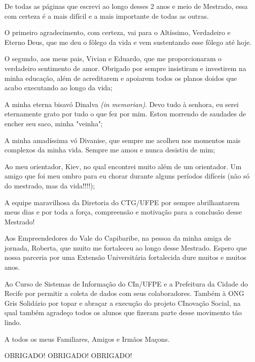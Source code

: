 \begin{agradecimentos}

De todas as páginas que escrevi ao longo desses 2 anos e meio de Mestrado, essa com certeza é a mais difícil e a mais importante de todas as outras.

O primeiro agradecimento, com certeza, vai para o Altíssimo, Verdadeiro e Eterno Deus, que me deu o fôlego da vida e vem sustentando esse fôlego até hoje.

O segundo, aos meus pais, Vivian e Eduardo, que me proporcionaram o verdadeiro sentimento de amor. Obrigado por sempre insistiram e investirem na minha educação, além de acreditarem e apoiarem todos os planos doidos que acabo executando ao longo da vida;

A minha eterna bisavó Dinalva \textit{(in memorian)}. Devo tudo à senhora, eu serei eternamente grato por tudo o que fez por mim. Estou morrendo de saudades de encher seu saco, minha "veinha";

A minha amadíssima vó Divanise, que sempre me acolheu nos momentos mais complexos da minha vida. Sempre me amou e nunca desistiu de mim;

Ao meu orientador, Kiev, no qual encontrei muito além de um orientador. Um amigo que foi meu ombro para eu chorar durante alguns períodos difíceis (não só do mestrado, mas da vida!!!!);

A equipe maravilhosa da Diretoria do CTG/UFPE por sempre abrilhantarem meus dias e por toda a força, compreensão e motivação para a conclusão desse Mestrado!

Aos Empreendedores do Vale do Capibaribe, na pessoa da minha amiga de jornada, Roberta, que muito me fortaleceu ao longo desse Mestrado. Espero que nossa parceria por uma Extensão Universitária fortalecida dure muitos e muitos anos.

Ao Curso de Sistemas de Informação do CIn/UFPE e a Prefeitura da Cidade do Recife por permitir a coleta de dados com seus colaboradores. Também à ONG Gris Solidário por topar e abraçar a execução do projeto CInovação Social, na qual também agradeço todos os alunos que fizeram parte desse movimento tão lindo.

A todos os meus Familiares, Amigos e Irmãos Maçons.

OBRIGADO! OBRIGADO! OBRIGADO!

\end{agradecimentos}